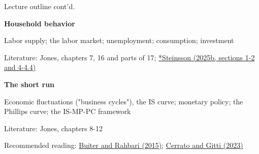 \documentclass[10pt,handout]{beamer}
\begin{document}
\begin{frame}{Lecture outline cont'd.}
\begin{itemize}
    \item [L5.] \textbf{Household behavior}
    \small{
    \item[] Labor supply; the labor market; unemployment; consumption; investment
    \item[] Literature: Jones, chapters 7, 16 and parts of 17; \href{https://eml.berkeley.edu/~jsteinsson/teaching/labor.pdf}{*Steinsson (2025b, sections 1-2 and 4-4.4)}
    }
\end{itemize}

\bigskip

\begin{itemize}
    \item[L6.] \textbf{The short run}
    \small{
    \item[] Economic fluctuations ("business cycles"), the IS curve; monetary policy; the Phillips curve; the IS-MP-PC framework
    \item[] Literature: Jones, chapters 8-12
    \item[] Recommended reading: \href{https://ir.citi.com/p\%2FJ9Uj80\%2BaxALKreeY0Z1vUZImlOZOLlB6g4Rv8kllN5sDCBZyPvGe3ti1Rfq\%2BSM}{Buiter and Rahbari (2015)}; \href{https://cepr.org/voxeu/columns/inflation-covid-demand-or-supply}{Cerrato and Gitti (2023)}
    }
\end{itemize}
\end{frame}
\end{document}
